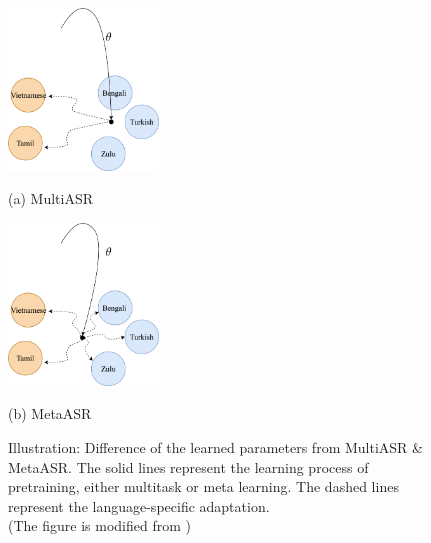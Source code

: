 \begin{figure}[htb]

\begin{minipage}[b]{0.48\linewidth}
  \centering
  \centerline{\includegraphics[width=4.0cm]{figs/multi_process.png}}
  \centerline{(a) MultiASR}\medskip
\end{minipage}
\hfill
\begin{minipage}[b]{0.48\linewidth}
  \centering
  \centerline{\includegraphics[width=4.0cm]{figs/meta_process.png}}
  \centerline{(b) MetaASR}\medskip
\end{minipage}
%
\caption{Illustration: Difference of the learned parameters from MultiASR \& MetaASR. The solid lines represent the learning process of pretraining, either multitask or meta learning. The dashed lines represent the language-specific adaptation.\\ (The figure is modified from \cite{gu2018meta})}
\label{fig:meta-idea}
%
\end{figure}


